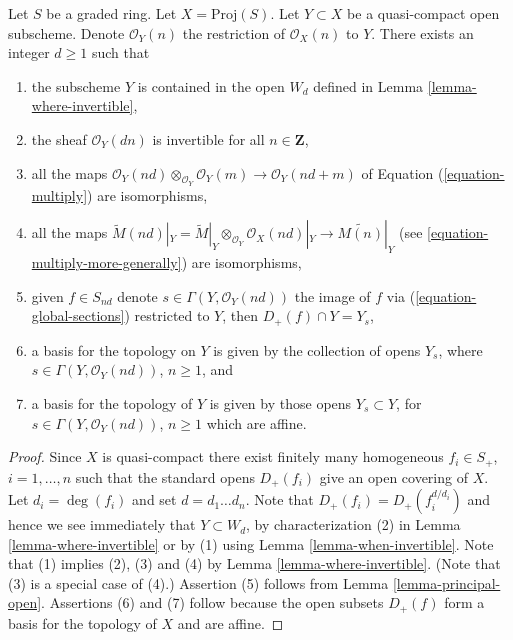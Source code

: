 \begin{lemma}
\label{lemma-ample-on-proj}
Let $S$ be a graded ring.
Let $X = \text{Proj}(S)$.
Let $Y \subset X$ be a quasi-compact open subscheme.
Denote $\mathcal{O}_Y(n)$ the restriction of
$\mathcal{O}_X(n)$ to $Y$.
There exists an integer $d \geq 1$ such that
\begin{enumerate}
\item the subscheme $Y$ is contained in the open $W_d$ defined
in Lemma \ref{lemma-where-invertible},
\item the sheaf $\mathcal{O}_Y(dn)$ is invertible for all $n \in \mathbf{Z}$,
\item all the maps
$\mathcal{O}_Y(nd) \otimes_{\mathcal{O}_Y} \mathcal{O}_Y(m)
\longrightarrow
\mathcal{O}_Y(nd + m)$
of Equation (\ref{equation-multiply}) are isomorphisms,
\item all the maps
$\widetilde M(nd)|_Y = \widetilde M|_Y \otimes_{\mathcal{O}_Y}
\mathcal{O}_X(nd)|_Y \to \widetilde{M(n)}|_Y$
(see \ref{equation-multiply-more-generally}) are isomorphisms,
\item given $f \in S_{nd}$ denote $s \in \Gamma(Y, \mathcal{O}_Y(nd))$
the image of $f$ via (\ref{equation-global-sections})
restricted to $Y$, then $D_{+}(f) \cap Y = Y_s$,
\item a basis for the topology on $Y$ is given
by the collection of opens $Y_s$, where $s \in \Gamma(Y, \mathcal{O}_Y(nd))$,
$n \geq 1$, and
\item a basis for the topology of $Y$ is given
by those opens $Y_s \subset Y$, for
$s \in \Gamma(Y, \mathcal{O}_Y(nd))$, $n \geq 1$ which are affine.
\end{enumerate}
\end{lemma}

\begin{proof}
Since $X$ is quasi-compact there exist finitely many homogeneous
$f_i \in S_{+}$, $i = 1, \ldots, n$ such that the standard opens
$D_{+}(f_i)$ give an open covering of $X$. Let $d_i = \deg(f_i)$ and set
$d = d_1 \ldots d_n$. Note that $D_{+}(f_i) = D_{+}(f_i^{d/d_i})$
and hence we see immediately that $Y \subset W_d$, by characterization
(2) in Lemma \ref{lemma-where-invertible} or
by (1) using Lemma \ref{lemma-when-invertible}.
Note that (1) implies (2), (3) and (4) by Lemma \ref{lemma-where-invertible}.
(Note that (3) is a special case of (4).)
Assertion (5) follows from Lemma \ref{lemma-principal-open}.
Assertions (6) and (7) follow because the open subsets $D_{+}(f)$
form a basis for the topology of $X$ and are affine.
\end{proof}












